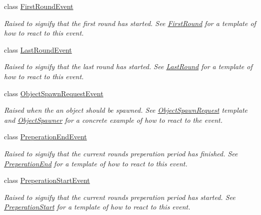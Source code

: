 \begin{DoxyCompactItemize}
class \hyperlink{class_round_manager_1_1_events_1_1_first_round_event}{First\+Round\+Event}
\begin{DoxyCompactList}\small\item\em Raised to signify that the first round has started. See \hyperlink{class_round_manager_1_1_first_round}{First\+Round} for a template of how to react to this event. \end{DoxyCompactList}\item 
class \hyperlink{class_round_manager_1_1_events_1_1_last_round_event}{Last\+Round\+Event}
\begin{DoxyCompactList}\small\item\em Raised to signify that the last round has started. See \hyperlink{class_round_manager_1_1_last_round}{Last\+Round} for a template of how to react to this event. \end{DoxyCompactList}\item 
class \hyperlink{class_round_manager_1_1_events_1_1_object_spawn_request_event}{Object\+Spawn\+Request\+Event}
\begin{DoxyCompactList}\small\item\em Raised when the an object should be spawned. See \hyperlink{class_round_manager_1_1_object_spawn_request}{Object\+Spawn\+Request} template and \hyperlink{class_round_manager_1_1_object_spawner}{Object\+Spawner} for a concrete example of how to react to the event. \end{DoxyCompactList}\item 
class \hyperlink{class_round_manager_1_1_events_1_1_preperation_end_event}{Preperation\+End\+Event}
\begin{DoxyCompactList}\small\item\em Raised to signify that the current rounds preperation period has finished. See \hyperlink{class_round_manager_1_1_preperation_end}{Preperation\+End} for a template of how to react to this event. \end{DoxyCompactList}\item 
class \hyperlink{class_round_manager_1_1_events_1_1_preperation_start_event}{Preperation\+Start\+Event}
\begin{DoxyCompactList}\small\item\em Raised to signify that the current rounds preperation period has started. See \hyperlink{class_round_manager_1_1_preperation_start}{Preperation\+Start} for a template of how to react to this event. \end{DoxyCompactList}\item 

\end{DoxyCompactItemize}
